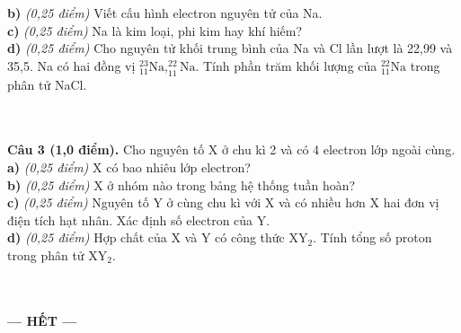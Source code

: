 \documentclass[11pt,a4paper]{article}
\begin{document}
\textbf{b)} \textit{(0,25 điểm)} Viết cấu hình electron nguyên tử của Na.\\

\textbf{c)} \textit{(0,25 điểm)} Na là kim loại, phi kim hay khí hiếm?\\

\textbf{d)} \textit{(0,25 điểm)} Cho nguyên tử khối trung bình của Na và Cl lần lượt là 22,99 và 35,5. Na có hai đồng vị $^{23}_{11}\text{Na}, ^{22}_{11}\text{Na}$. Tính phần trăm khối lượng của $^{22}_{11}\text{Na}$ trong phân tử NaCl.\\
\noindent\dotfill\\
\noindent\dotfill\\
\noindent\dotfill\par\vspace{3pt}


\textbf{Câu 3 (1,0 điểm).} Cho nguyên tố X ở chu kì 2 và có 4 electron lớp ngoài cùng.\\
\textbf{a)} \textit{(0,25 điểm)} X có bao nhiêu lớp electron?\\

\textbf{b)} \textit{(0,25 điểm)} X ở nhóm nào trong bảng hệ thống tuần hoàn?\\

\textbf{c)} \textit{(0,25 điểm)} Nguyên tố Y ở cùng chu kì với X và có nhiều hơn X hai đơn vị điện tích hạt nhân. Xác định số electron của Y.\\

\textbf{d)} \textit{(0,25 điểm)} Hợp chất của X và Y có công thức $\text{XY}_2$. Tính tổng số proton trong phân tử $\text{XY}_2$.\\
\noindent\dotfill\\
\noindent\dotfill\\
\noindent\dotfill\par\vspace{3pt}


\begin{center}
\textbf{--- HẾT ---}
\end{center}
\end{document}
